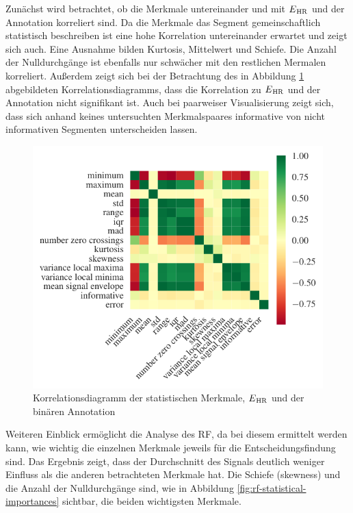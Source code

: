 Zunächst wird betrachtet, ob die Merkmale untereinander und mit $E\textsubscript{HR}$ und der Annotation korreliert sind. Da die Merkmale das Segment gemeinschaftlich statistisch beschreiben ist eine hohe Korrelation untereinander erwartet und zeigt sich auch. Eine Ausnahme bilden Kurtosis, Mittelwert und Schiefe. Die Anzahl der Nulldurchgänge ist ebenfalls nur schwächer mit den restlichen Mermalen korreliert. Außerdem zeigt sich bei der Betrachtung des in Abbildung \ref{fig:corr-heatmap-statistical} abgebildeten Korrelationsdiagramms, dass die Korrelation zu $E\textsubscript{HR}$ und der Annotation nicht signifikant ist. Auch bei paarweiser Visualisierung zeigt sich, dass sich anhand keines untersuchten Merkmalspaares informative von nicht informativen Segmenten unterscheiden lassen.

\begin{figure}[H]
	\centering
	\includegraphics[scale=0.95]{pic/corr-heatmap-statistical.pdf}
	\caption{Korrelationsdiagramm der statistischen Merkmale, $E\textsubscript{HR}$ und der binären Annotation}
	\label{fig:corr-heatmap-statistical}
\end{figure}

Weiteren Einblick ermöglicht die Analyse des \ac{RF}, da bei diesem ermittelt werden kann, wie wichtig die einzelnen Merkmale jeweils für die Entscheidungsfindung sind. Das Ergebnis zeigt, dass der Durchschnitt des Signals deutlich weniger Einfluss als die anderen betrachteten Merkmale hat. Die Schiefe (skewness) und die Anzahl der Nulldurchgänge sind, wie in Abbildung \ref{fig:rf-statistical-importances} sichtbar, die beiden wichtigsten Merkmale. 

